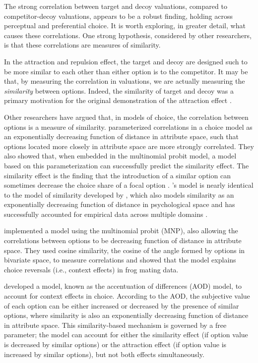 The strong correlation between target and decoy valuations, compared to competitor-decoy valuations, appears to be a robust finding, holding across perceptual and preferential choice. It is worth exploring, in greater detail, what causes these correlations. One strong hypothesis, considered by other researchers, is that these correlations are measures of similarity. 

In the attraction and repulsion effect, the target and decoy are designed such to be more similar to each other than either option is to the competitor. It may be that, by measuring the correlation in valuations, we are actually measuring the \textit{similarity} between options. Indeed, the similarity of target and decoy was a primary motivation for the original demonstration of the attraction effect \parencite{huberAddingAsymmetricallyDominated1982d}. 

Other researchers have argued that, in models of choice, the correlation between options is a measure of similarity. \textcite{kamakura1984predicting} parameterized correlations in a choice model as an exponentially decreasing function of distance in attribute space, such that options located more closely in attribute space are more strongly correlated. They also showed that, when embedded in the multinomial probit model, a model based on this parameterization can successfully predict the similarity effect. The similarity effect is the finding that the introduction of a similar option can sometimes decrease the choice share of a focal option \textcite{tverskyEliminationAspectsTheory1972}. \textcite{kamakura1984predicting}'s model is nearly identical to the model of similarity developed by \textcite{shepardUniversalLawGeneralization1987c}, which also models similarity as an exponentially decreasing function of distance in psychological space and has successfully accounted for empirical data across multiple domains \parencite{nosofskyAttentionSimilarityIdentificationCategorization1986,hotalingTheoreticalDevelopmentsDecision2010,roads2024modeling,townsend1971theoretical}. 

\textcite{natenzon2019random} implemented a model using the multinomial probit (MNP), also allowing the correlations between options to be decreasing function of distance in attribute space. They used cosine similarity, the cosine of the angle formed by options in bivariate space, to measure correlations and showed that the model explains choice reversals (i.e., context effects) in frog mating data. 

\textcite{spektor2019similarity} developed a model, known as the accentuation of differences (AOD) model, to account for context effects in choice. According to the AOD, the subjective value of each option can be either increased or decreased by the presence of similar options, where similarity is also an exponentially decreasing function of distance in attribute space. This similarity-based mechanism is governed by a free parameter; the model can account for either the similarity effect (if option value is decreased by similar options) or the attraction effect (if option value is increased by similar options), but not both effects simultaneously.

